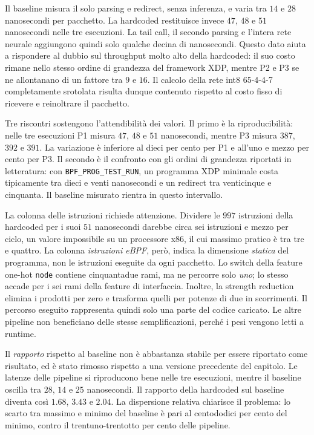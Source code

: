 \documentclass[binding=0.6cm,italian,oneside,noexaminfo]{sapthesis}
\begin{document}
Il baseline misura il solo parsing e redirect, senza inferenza, e varia tra $14$ e $28$ nanosecondi per pacchetto. La hardcoded restituisce invece $47$, $48$ e $51$ nanosecondi nelle tre esecuzioni. La tail call, il secondo parsing e l'intera rete neurale aggiungono quindi solo qualche decina di nanosecondi. Questo dato aiuta a rispondere al dubbio sul throughput molto alto della hardcoded: il suo costo rimane nello stesso ordine di grandezza del framework XDP, mentre P2 e P3 se ne allontanano di un fattore tra $9$ e $16$. Il calcolo della rete int8 65-4-4-7 completamente srotolata risulta dunque contenuto rispetto al costo fisso di ricevere e reinoltrare il pacchetto.

Tre riscontri sostengono l'attendibilità dei valori. Il primo è la riproducibilità: nelle tre esecuzioni P1 misura $47$, $48$ e $51$ nanosecondi, mentre P3 misura $387$, $392$ e $391$. La variazione è inferiore al dieci per cento per P1 e all'uno e mezzo per cento per P3. Il secondo è il confronto con gli ordini di grandezza riportati in letteratura: con \texttt{BPF\_PROG\_TEST\_RUN}, un programma XDP minimale costa tipicamente tra dieci e venti nanosecondi e un redirect tra venticinque e cinquanta. Il baseline misurato rientra in questo intervallo.

La colonna delle istruzioni richiede attenzione. Dividere le $997$ istruzioni della hardcoded per i suoi $51$ nanosecondi darebbe circa sei istruzioni e mezzo per ciclo, un valore impossibile su un processore x86, il cui massimo pratico è tra tre e quattro. La colonna \emph{istruzioni eBPF}, però, indica la dimensione \emph{statica} del programma, non le istruzioni eseguite da ogni pacchetto. Lo switch della feature one-hot \texttt{node} contiene cinquantadue rami, ma ne percorre solo \emph{uno}; lo stesso accade per i sei rami della feature di interfaccia. Inoltre, la strength reduction elimina i prodotti per zero e trasforma quelli per potenze di due in scorrimenti. Il percorso eseguito rappresenta quindi solo una parte del codice caricato. Le altre pipeline non beneficiano delle stesse semplificazioni, perché i pesi vengono letti a runtime.

Il \emph{rapporto} rispetto al baseline non è abbastanza stabile per essere riportato come risultato, ed è stato rimosso rispetto a una versione precedente del capitolo. Le latenze delle pipeline si riproducono bene nelle tre esecuzioni, mentre il baseline oscilla tra $28$, $14$ e $25$ nanosecondi. Il rapporto della hardcoded sul baseline diventa così $1.68$, $3.43$ e $2.04$. La dispersione relativa chiarisce il problema: lo scarto tra massimo e minimo del baseline è pari al centododici per cento del minimo, contro il trentuno-trentotto per cento delle pipeline.
\end{document}

